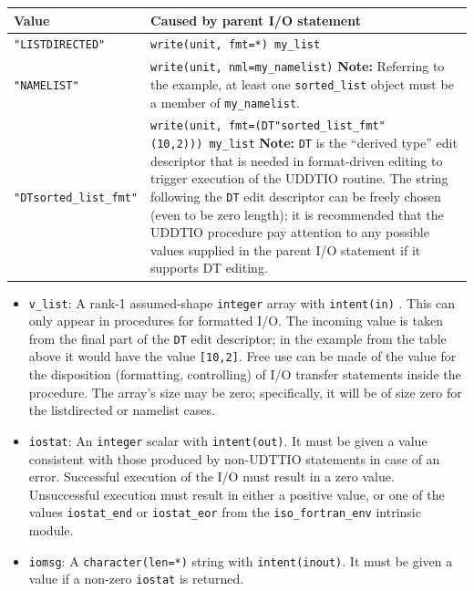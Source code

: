 \documentclass[
  paper=a4,
  ,captions=tableheading
]{scrartcl}
\providecommand{\tightlist}{%
  \setlength{\itemsep}{0pt}\setlength{\parskip}{0pt}}
\begin{document}
\begin{longtable}[]{@{}
  >{\raggedright\arraybackslash}p{}
  >{\raggedright\arraybackslash}p{}@{}}
\toprule\noalign{}
\begin{minipage}[b]{\linewidth}\raggedright
Value
\end{minipage} & \begin{minipage}[b]{\linewidth}\raggedright
Caused by parent I/O statement
\end{minipage} \\
\midrule\noalign{}
\endhead
\bottomrule\noalign{}
\endlastfoot
\texttt{"LISTDIRECTED"} & \texttt{write(unit,\ fmt=*)\ my\_list} \\
\texttt{"NAMELIST"} & \texttt{write(unit,\ nml=my\_namelist)}
\textbf{Note:} Referring to the example, at least one
\texttt{sorted\_list} object must be a member of
\texttt{my\_namelist}. \\
\texttt{"DTsorted\_list\_fmt"} &
\texttt{write(unit,\ fmt=\textquotesingle{}(DT"sorted\_list\_fmt"(10,2))\textquotesingle{})\ my\_list}
\textbf{Note:} \texttt{DT} is the ``derived type'' edit descriptor that
is needed in format-driven editing to trigger execution of the UDDTIO
routine. The string following the \texttt{DT} edit descriptor can be
freely chosen (even to be zero length); it is recommended that the
UDDTIO procedure pay attention to any possible values supplied in the
parent I/O statement if it supports DT editing. \\
\end{longtable}

\begin{itemize}
\tightlist
\item
  \texttt{v\_list}: A rank-1 assumed-shape \texttt{integer} array with
  \texttt{intent(in)} . This can only appear in procedures for formatted
  I/O. The incoming value is taken from the final part of the
  \texttt{DT} edit descriptor; in the example from the table above it
  would have the value \texttt{{[}10,2{]}}. Free use can be made of the
  value for the disposition (formatting, controlling) of I/O transfer
  statements inside the procedure. The array's size may be zero;
  specifically, it will be of size zero for the listdirected or namelist
  cases.
\item
  \texttt{iostat}: An \texttt{integer} scalar with \texttt{intent(out)}.
  It must be given a value consistent with those produced by non-UDTTIO
  statements in case of an error. Successful execution of the I/O must
  result in a zero value. Unsuccessful execution must result in either a
  positive value, or one of the values \texttt{iostat\_end} or
  \texttt{iostat\_eor} from the \texttt{iso\_fortran\_env} intrinsic
  module.
\item
  \texttt{iomsg}: A \texttt{character(len=*)} string with
  \texttt{intent(inout)}. It must be given a value if a non-zero
  \texttt{iostat} is returned.
\end{itemize}
\end{document}
